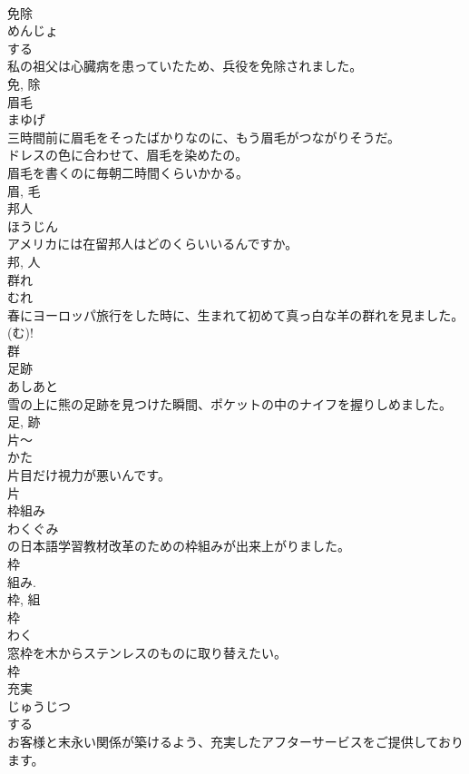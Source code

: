 \documentclass[8pt]{extreport}
\begin{document}
\begin{CJK}{UTF8}{min}
\\	免除	
\\	めんじょ	
\\	する 
\\	私の祖父は心臓病を患っていたため、兵役を免除されました。	
\\	免, 除	
\\	眉毛	
\\	まゆげ	
\\	三時間前に眉毛をそったばかりなのに、もう眉毛がつながりそうだ。	
\\	ドレスの色に合わせて、眉毛を染めたの。	
\\	眉毛を書くのに毎朝二時間くらいかかる。	
\\	眉, 毛	
\\	邦人	
\\	ほうじん	
\\	アメリカには在留邦人はどのくらいいるんですか。	
\\	邦, 人	
\\	群れ	
\\	むれ	
\\	春にヨーロッパ旅行をした時に、生まれて初めて真っ白な羊の群れを見ました。	
\\	(む)! 
\\	群	
\\	足跡	
\\	あしあと	
\\	雪の上に熊の足跡を見つけた瞬間、ポケットの中のナイフを握りしめました。	
\\	足, 跡	
\\	片〜	
\\	かた	
\\	片目だけ視力が悪いんです。	
\\	片	
\\	枠組み	
\\	わくぐみ	
\\	の日本語学習教材改革のための枠組みが出来上がりました。	
\\	枠 
\\	組み. 
\\	枠, 組	
\\	枠	
\\	わく	
\\	窓枠を木からステンレスのものに取り替えたい。	
\\	枠	
\\	充実	
\\	じゅうじつ	
\\	する 
\\	お客様と末永い関係が築けるよう、充実したアフターサービスをご提供しております。	

\end{CJK}
\end{document}

